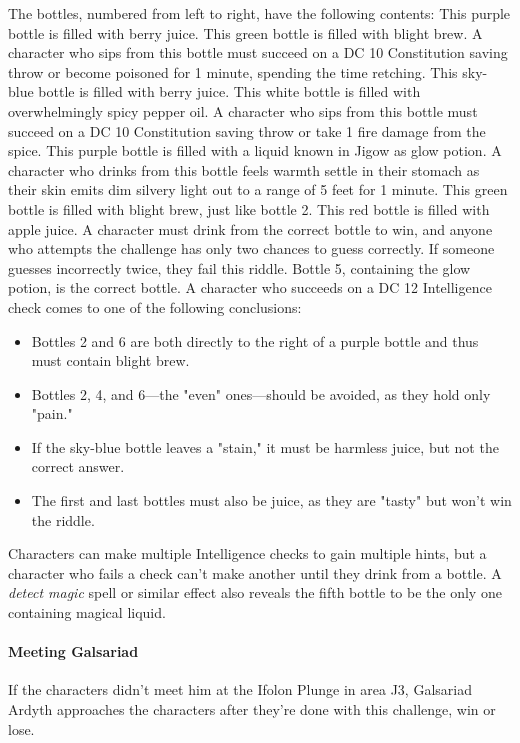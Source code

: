 \documentclass[10pt,a4,twoside,twocolumn,openany,nodeprecatedcode]{dndbook}
\begin{document}
The bottles, numbered from left to right, have the following contents:
{{This purple bottle is filled with berry juice.}}
{{This green bottle is filled with blight brew. A character who sips from this bottle must succeed on a DC 10 Constitution saving throw or become poisoned for 1 minute, spending the time retching.}}
{{This sky-blue bottle is filled with berry juice.}}
{{This white bottle is filled with overwhelmingly spicy pepper oil. A character who sips from this bottle must succeed on a DC 10 Constitution saving throw or take 1 fire damage from the spice.}}
{{This purple bottle is filled with a liquid known in Jigow as glow potion. A character who drinks from this bottle feels warmth settle in their stomach as their skin emits dim silvery light out to a range of 5 feet for 1 minute.}}
{{This green bottle is filled with blight brew, just like bottle 2.}}
{{This red bottle is filled with apple juice.}}
A character must drink from the correct bottle to win, and anyone who attempts the challenge has only two chances to guess correctly. If someone guesses incorrectly twice, they fail this riddle. Bottle 5, containing the glow potion, is the correct bottle.
A character who succeeds on a DC 12 Intelligence check comes to one of the following conclusions:
\begin{itemize}

\item Bottles 2 and 6 are both directly to the right of a purple bottle and thus must contain blight brew.
\item Bottles 2, 4, and 6—the "even" ones—should be avoided, as they hold only "pain."
\item If the sky-blue bottle leaves a "stain," it must be harmless juice, but not the correct answer.
\item The first and last bottles must also be juice, as they are "tasty" but won't win the riddle.
\end{itemize}


Characters can make multiple Intelligence checks to gain multiple hints, but a character who fails a check can't make another until they drink from a bottle.
A \textit{detect magic} spell or similar effect also reveals the fifth bottle to be the only one containing magical liquid.
\paragraph{Meeting Galsariad}
If the characters didn't meet him at the Ifolon Plunge in area J3, Galsariad Ardyth approaches the characters after they're done with this challenge, win or lose.
\end{document}
